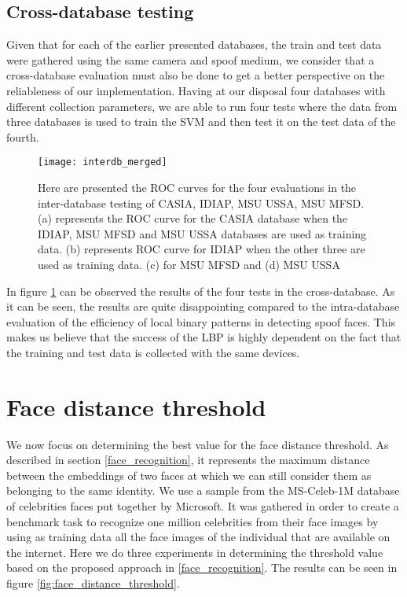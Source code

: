 \subsection{Cross-database testing}\label{section:cross_database_testing}
Given that for each of the earlier presented databases, the train and test data were gathered using the same camera and spoof medium, we consider that a cross-database evaluation must also be done to get a better perspective on the reliableness of our implementation. Having at our disposal four databases with different collection parameters, we are able to run four tests where the data from three databases is used to train the SVM and then test it on the test data of the fourth. 
\begin{figure}[H]
	\captionsetup{width=15cm,font=small}
	\begin{center}
		\texttt{[image: interdb\_merged]}
	\end{center}
	\caption[Cross-database face spoof classification results]{Here are presented the ROC curves for the four evaluations in the inter-database testing of CASIA, IDIAP, MSU USSA, MSU MFSD. (a) represents the ROC curve for the CASIA database when the IDIAP, MSU MFSD and MSU USSA databases are used as training data. (b) represents ROC curve for IDIAP when the other three are used as training data. (c) for MSU MFSD and (d) MSU USSA}
	\label{fig:interdb_results}
\end{figure}
In figure \ref{fig:interdb_results} can be observed the results of the four tests in the cross-database. As it can be seen, the results are quite disappointing compared to the intra-database evaluation of the efficiency of local binary patterns in detecting spoof faces. This makes us believe that the success of the LBP is highly dependent on the fact that the training and test data is collected with the same devices.

\section{Face distance threshold}
We now focus on determining the best value for the face distance threshold. As described in section \ref{face_recognition}, it represents the maximum distance between the embeddings of two faces at which we can still consider them as belonging to the same identity. We use a sample from the MS-Celeb-1M database of celebrities faces put together by Microsoft. It was gathered in order to create a benchmark task to recognize one million celebrities from their face images by using as training data all the face images of the individual that are available on the internet. Here we do three experiments in determining the threshold value based on the proposed approach in \ref{face_recognition}. The results can be seen in figure \ref{fig:face_distance_threshold}. 

